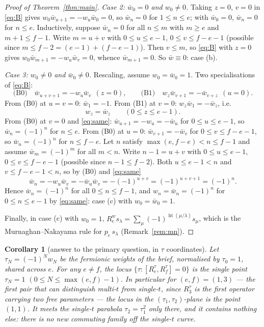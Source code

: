 \documentclass[11pt]{article}
\newtheorem{corollary}[theorem]{Corollary}
\theoremstyle{definition}
\newcommand{\hgt}{\operatorname{ht}}   %
\begin{document}
\begin{proof}[Proof of Theorem~\ref{thm:main}]
\emph{Case 2: $\bar w_0=0$ and $w_0\ne0$.}  Taking $z=0$, $v=0$ in \eqref{eq:B} gives
$w_0\bar w_{u+1}=-w_u\bar w_0=0$, so $\bar w_n=0$ for $1\le n\le e$; with $\bar w_0=0$,
$\bar w_n=0$ for $n\le e$.  Inductively, suppose $\bar w_n=0$ for all $n\le m$ with
$m\ge e$ and $m+1\le f-1$.  Write $m=u+v$ with $0\le u\le e-1$, $0\le v\le f-e-1$
(possible since $m\le f-2=(e-1)+(f-e-1)$).  Then $v\le m$, so \eqref{eq:B} with $z=0$
gives $w_0\bar w_{m+1}=-w_u\bar w_v=0$, whence $\bar w_{m+1}=0$.  So $\bar w\equiv0$:
case (b).

\emph{Case 3: $w_0\ne0$ and $\bar w_0\ne0$.}  Rescaling, assume $w_0=\bar w_0=1$.  Two
specialisations of \eqref{eq:B}:
\[
  \text{(B0)}\quad \bar w_{u+v+1}=-w_u\bar w_v\ \ (z=0),
  \qquad
  \text{(B1)}\quad w_z\bar w_{v+1}=-\bar w_{v+z}\ \ (u=0).
\]
From (B0) at $u=v=0$: $\bar w_1=-1$.  From (B1) at $v=0$: $w_z\bar w_1=-\bar w_z$, i.e.
\begin{equation}\label{eq:same}
  w_z=\bar w_z\qquad(0\le z\le e-1).
\end{equation}
From (B0) at $v=0$ and \eqref{eq:same}: $\bar w_{u+1}=-w_u=-\bar w_u$ for
$0\le u\le e-1$, so $\bar w_n=(-1)^n$ for $n\le e$.  From (B0) at $u=0$:
$\bar w_{v+1}=-\bar w_v$ for $0\le v\le f-e-1$, so $\bar w_n=(-1)^n$ for $n\le f-e$.
Let $n$ satisfy $\max(e,f-e)<n\le f-1$ and assume $\bar w_m=(-1)^m$ for all $m<n$.
Write $n-1=u+v$ with $0\le u\le e-1$, $0\le v\le f-e-1$ (possible since
$n-1\le f-2$).  Both $u\le e-1<n$ and $v\le f-e-1<n$, so by (B0) and \eqref{eq:same}
\[
  \bar w_n=-w_u\bar w_v=-\bar w_u\bar w_v=-(-1)^{u+v}=(-1)^{u+v+1}=(-1)^n .
\]
Hence $\bar w_n=(-1)^n$ for all $0\le n\le f-1$, and $w_n=\bar w_n=(-1)^n$ for
$0\le n\le e-1$ by \eqref{eq:same}: case (c) with $w_0=\bar w_0=1$.

Finally, in case (c) with $w_0=1$, $R_e^{w}s_\lambda=\sum_\mu(-1)^{\hgt(\mu/\lambda)}
s_\mu$, which is the Murnaghan--Nakayama rule for $p_e\,s_\lambda$
(Remark~\ref{rem:mn}).
\end{proof}

\begin{corollary}[answer to the primary question, in $\tau$ coordinates]\label{cor:tau}
Let $\tau_N=(-1)^Nw_N$ be the fermionic weights of the brief, normalised by $\tau_0=1$,
shared across $e$.  For any $e\ne f$, the locus
$\{\tau:[R_e^{\tau},R_f^{\tau}]=0\}$ is the single point $\tau_N=1$
$(0\le N\le\max(e,f)-1)$.  In particular for $(e,f)=(1,3)$ --- the first pair that can
distinguish multi-$t$ from single-$t$, since $R_3^{\tau}$ is the first operator carrying
two free parameters --- the locus in the $(\tau_1,\tau_2)$-plane is the point $(1,1)$.
It meets the single-$t$ parabola $\tau_2=\tau_1^2$ only there, and it contains nothing
else: there is no new commuting family off the single-$t$ curve.
\end{corollary}
\end{document}
